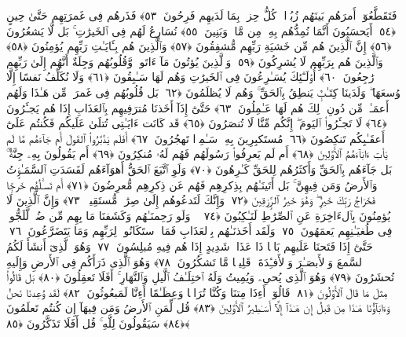 فَتَقَطَّعُوٓا۟ أَمرَهُم بَينَهُم زُبُرًۭا ۖ كُلُّ حِزبٍۭ بِمَا لَدَيهِم فَرِحُونَ ﴿٥٣﴾
 فَذَرهُم فِى غَمرَتِهِم حَتَّىٰ حِينٍ ﴿٥٤﴾
 أَيَحسَبُونَ أَنَّمَا نُمِدُّهُم بِهِۦ مِن مَّالٍۢ وَبَنِينَ ﴿٥٥﴾
 نُسَارِعُ لَهُم فِى ٱلخَيرَٰتِ ۚ بَل لَّا يَشعُرُونَ ﴿٥٦﴾
 إِنَّ ٱلَّذِينَ هُم مِّن خَشيَةِ رَبِّهِم مُّشفِقُونَ ﴿٥٧﴾
 وَٱلَّذِينَ هُم بِـَٔايَـٰتِ رَبِّهِم يُؤمِنُونَ ﴿٥٨﴾
 وَٱلَّذِينَ هُم بِرَبِّهِم لَا يُشرِكُونَ ﴿٥٩﴾
 وَٱلَّذِينَ يُؤتُونَ مَآ ءَاتَوا۟ وَّقُلُوبُهُم وَجِلَةٌ أَنَّهُم إِلَىٰ رَبِّهِم رَٰجِعُونَ ﴿٦٠﴾
 أُو۟لَـٰٓئِكَ يُسَـٰرِعُونَ فِى ٱلخَيرَٰتِ وَهُم لَهَا سَـٰبِقُونَ ﴿٦١﴾
 وَلَا نُكَلِّفُ نَفسًا إِلَّا وُسعَهَا ۖ وَلَدَينَا كِتَـٰبٌۭ يَنطِقُ بِٱلحَقِّ ۚ وَهُم لَا يُظلَمُونَ ﴿٦٢﴾
 بَل قُلُوبُهُم فِى غَمرَةٍۢ مِّن هَـٰذَا وَلَهُم أَعمَـٰلٌۭ مِّن دُونِ ذَٟلِكَ هُم لَهَا عَـٰمِلُونَ ﴿٦٣﴾
 حَتَّىٰٓ إِذَآ أَخَذنَا مُترَفِيهِم بِٱلعَذَابِ إِذَا هُم يَجـَٔرُونَ ﴿٦٤﴾
 لَا تَجـَٔرُوا۟ ٱليَومَ ۖ إِنَّكُم مِّنَّا لَا تُنصَرُونَ ﴿٦٥﴾
 قَد كَانَت ءَايَـٰتِى تُتلَىٰ عَلَيكُم فَكُنتُم عَلَىٰٓ أَعقَـٰبِكُم تَنكِصُونَ ﴿٦٦﴾
 مُستَكبِرِينَ بِهِۦ سَـٰمِرًۭا تَهجُرُونَ ﴿٦٧﴾
 أَفَلَم يَدَّبَّرُوا۟ ٱلقَولَ أَم جَآءَهُم مَّا لَم يَأتِ ءَابَآءَهُمُ ٱلأَوَّلِينَ ﴿٦٨﴾
 أَم لَم يَعرِفُوا۟ رَسُولَهُم فَهُم لَهُۥ مُنكِرُونَ ﴿٦٩﴾
 أَم يَقُولُونَ بِهِۦ جِنَّةٌۢ ۚ بَل جَآءَهُم بِٱلحَقِّ وَأَكثَرُهُم لِلحَقِّ كَـٰرِهُونَ ﴿٧٠﴾
 وَلَوِ ٱتَّبَعَ ٱلحَقُّ أَهوَآءَهُم لَفَسَدَتِ ٱلسَّمَـٰوَٟتُ وَٱلأَرضُ وَمَن فِيهِنَّ ۚ بَل أَتَينَـٰهُم بِذِكرِهِم فَهُم عَن ذِكرِهِم مُّعرِضُونَ ﴿٧١﴾
 أَم تَسـَٔلُهُم خَرجًۭا فَخَرَاجُ رَبِّكَ خَيرٌۭ ۖ وَهُوَ خَيرُ ٱلرَّٟزِقِينَ ﴿٧٢﴾
 وَإِنَّكَ لَتَدعُوهُم إِلَىٰ صِرَٰطٍۢ مُّستَقِيمٍۢ ﴿٧٣﴾
 وَإِنَّ ٱلَّذِينَ لَا يُؤمِنُونَ بِٱلءَاخِرَةِ عَنِ ٱلصِّرَٰطِ لَنَـٰكِبُونَ ﴿٧٤﴾
 ۞ وَلَو رَحِمنَـٰهُم وَكَشَفنَا مَا بِهِم مِّن ضُرٍّۢ لَّلَجُّوا۟ فِى طُغيَـٰنِهِم يَعمَهُونَ ﴿٧٥﴾
 وَلَقَد أَخَذنَـٰهُم بِٱلعَذَابِ فَمَا ٱستَكَانُوا۟ لِرَبِّهِم وَمَا يَتَضَرَّعُونَ ﴿٧٦﴾
 حَتَّىٰٓ إِذَا فَتَحنَا عَلَيهِم بَابًۭا ذَا عَذَابٍۢ شَدِيدٍ إِذَا هُم فِيهِ مُبلِسُونَ ﴿٧٧﴾
 وَهُوَ ٱلَّذِىٓ أَنشَأَ لَكُمُ ٱلسَّمعَ وَٱلأَبصَـٰرَ وَٱلأَفـِٔدَةَ ۚ قَلِيلًۭا مَّا تَشكُرُونَ ﴿٧٨﴾
 وَهُوَ ٱلَّذِى ذَرَأَكُم فِى ٱلأَرضِ وَإِلَيهِ تُحشَرُونَ ﴿٧٩﴾
 وَهُوَ ٱلَّذِى يُحىِۦ وَيُمِيتُ وَلَهُ ٱختِلَـٰفُ ٱلَّيلِ وَٱلنَّهَارِ ۚ أَفَلَا تَعقِلُونَ ﴿٨٠﴾
 بَل قَالُوا۟ مِثلَ مَا قَالَ ٱلأَوَّلُونَ ﴿٨١﴾
 قَالُوٓا۟ أَءِذَا مِتنَا وَكُنَّا تُرَابًۭا وَعِظَـٰمًا أَءِنَّا لَمَبعُوثُونَ ﴿٨٢﴾
 لَقَد وُعِدنَا نَحنُ وَءَابَآؤُنَا هَـٰذَا مِن قَبلُ إِن هَـٰذَآ إِلَّآ أَسَـٰطِيرُ ٱلأَوَّلِينَ ﴿٨٣﴾
 قُل لِّمَنِ ٱلأَرضُ وَمَن فِيهَآ إِن كُنتُم تَعلَمُونَ ﴿٨٤﴾
 سَيَقُولُونَ لِلَّهِ ۚ قُل أَفَلَا تَذَكَّرُونَ ﴿٨٥﴾
